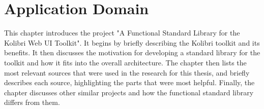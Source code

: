 \chapter{Application Domain}
\label{chap:application_domain}
This chapter introduces the project "A Functional Standard Library for the
Kolibri Web UI Toolkit". It begins by briefly describing the Kolibri toolkit
and its benefits. It then discusses the motivation for developing a standard
library for the toolkit and how it fits into the overall architecture. The
chapter then lists the most relevant sources that were used in the research for
this thesis, and briefly describes each source, highlighting the parts that
were most helpful. Finally, the chapter discusses other similar projects and
how the functional standard library differs from them.




